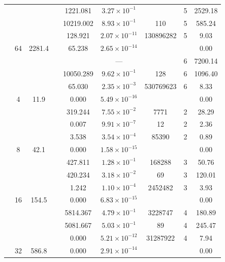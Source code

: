 \begin{table}[htbp]
\begin{tabular}{l S[table-format=3.0] S[table-format=4.1] l S[table-format=3.3] S[table-format=1.2e2] S[table-format=6.0] S[table-format=2.0] S[table-format=4.2]}
     &  &  &  & 1221.081 & $3.27 \times 10^{-1}$ & {\text{---}} & 5 & 2529.18 \\
     &  &  &  & 10219.002 & $8.93 \times 10^{-1}$ & 110 & 5 & 585.24 \\
     &  &  &  & 128.921 & $2.07 \times 10^{-11}$ & 130896282 & 5 & 9.03 \\
     & 64 & 2281.4 &  & 65.238 & $2.65 \times 10^{-14}$ & {\text{---}} & {\text{---}} & 0.00 \\
     &  &  &  & {\text{---}} & ${\text{---}}$ & {\text{---}} & 6 & 7200.14 \\
     &  &  &  & 10050.289 & $9.62 \times 10^{-1}$ & 128 & 6 & 1096.40 \\
     &  &  &  & 65.030 & $2.35 \times 10^{-3}$ & 530769623 & 6 & 8.33 \\
    \midrule
     & 4 & 11.9 &  & 0.000 & $5.49 \times 10^{-16}$ & {\text{---}} & {\text{---}} & 0.00 \\
     &  &  &  & 319.244 & $7.55 \times 10^{-2}$ & 7771 & 2 & 28.29 \\
     &  &  &  & 0.007 & $9.91 \times 10^{-7}$ & 12 & 2 & 2.36 \\
     &  &  &  & 3.538 & $3.54 \times 10^{-4}$ & 85390 & 2 & 0.89 \\
     & 8 & 42.1 &  & 0.000 & $1.58 \times 10^{-15}$ & {\text{---}} & {\text{---}} & 0.00 \\
     &  &  &  & 427.811 & $1.28 \times 10^{-1}$ & 168288 & 3 & 50.76 \\
     &  &  &  & 420.234 & $3.18 \times 10^{-2}$ & 69 & 3 & 120.01 \\
     &  &  &  & 1.242 & $1.10 \times 10^{-4}$ & 2452482 & 3 & 3.93 \\
     & 16 & 154.5 &  & 0.000 & $6.83 \times 10^{-15}$ & {\text{---}} & {\text{---}} & 0.00 \\
     &  &  &  & 5814.367 & $4.79 \times 10^{-1}$ & 3228747 & 4 & 180.89 \\
     &  &  &  & 5081.667 & $5.03 \times 10^{-1}$ & 89 & 4 & 245.47 \\
     &  &  &  & 0.000 & $5.21 \times 10^{-12}$ & 31287922 & 4 & 7.94 \\
     & 32 & 586.8 &  & 0.000 & $2.91 \times 10^{-14}$ & {\text{---}} & {\text{---}} & 0.00 \\

\end{tabular}
\end{table}
